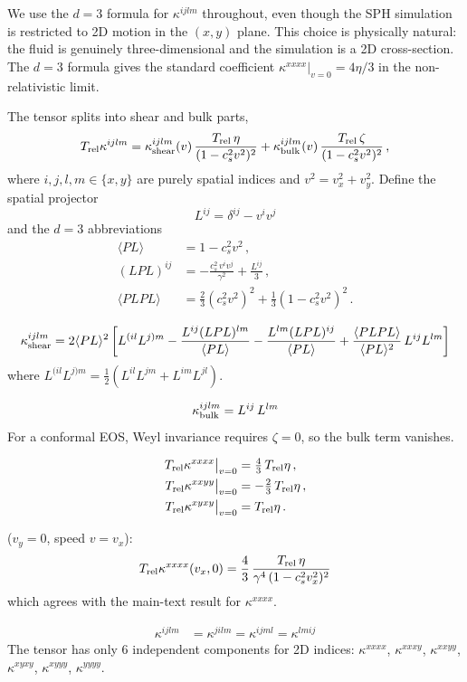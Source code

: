 \documentclass[12pt,aps,preprint,nofootinbib,noshowkeys,noshowpacs,longbibliography,superscriptaddress,tightenlines]{revtex4-2}
\def\st{\begin{equation}}
\def\stp{\end{equation}}
\begin{document}
We use the $d=3$ formula for $\kappa^{ijlm}$ throughout, even though the SPH
simulation is restricted to 2D motion in the $(x,y)$ plane.  This choice is
physically natural: the fluid is genuinely three-dimensional and the simulation
is a 2D cross-section.  The $d=3$ formula gives the standard coefficient
$\kappa^{xxxx}|_{v=0} = 4\eta/3$ in the non-relativistic limit.

The tensor splits into shear and bulk parts,
\st
T_{\rm rel}\kappa^{ijlm}
   = \kappa_{\rm shear}^{ijlm}(v)\,\frac{T_{\rm rel}\,\eta}{(1-c_s^2 v^2)^2}
   + \kappa_{\rm bulk}^{ijlm}(v)\,\frac{T_{\rm rel}\,\zeta}{(1-c_s^2 v^2)^2}\,,
\stp
where $i,j,l,m\in\{x,y\}$ are purely spatial indices and
$v^2 = v_x^2 + v_y^2$.  Define the spatial projector
\st
L^{ij} = \delta^{ij} - v^i v^j
\stp
and the $d=3$ abbreviations
\begin{align}
\langle PL\rangle &= 1 - c_s^2 v^2 \,,\\
(LPL)^{ij} &= -\frac{c_s^2\,v^i v^j}{\gamma^2} + \frac{L^{ij}}{3} \,,\\
\langle PLPL\rangle &= \frac{2}{3}(c_s^2 v^2)^2 + \frac{1}{3}(1-c_s^2 v^2)^2 \,.
\end{align}

\st
\kappa_{\rm shear}^{ijlm} = 2\langle PL\rangle^2\left[L^{(il}L^{j)m}
  - \frac{L^{ij}(LPL)^{lm}}{\langle PL\rangle}
  - \frac{L^{lm}(LPL)^{ij}}{\langle PL\rangle}
  + \frac{\langle PLPL\rangle}{\langle PL\rangle^2}\,L^{ij}L^{lm}\right]
\stp
where $L^{(il}L^{j)m} = \frac{1}{2}(L^{il}L^{jm}+L^{im}L^{jl})$.

\st
\kappa_{\rm bulk}^{ijlm} = L^{ij}\,L^{lm}
\stp
For a conformal EOS, Weyl invariance requires $\zeta=0$, so the bulk term vanishes.

\begin{align}
T_{\rm rel}\kappa^{xxxx}\big|_{v=0} &= \tfrac{4}{3}\,T_{\rm rel}\eta\,,\\
T_{\rm rel}\kappa^{xxyy}\big|_{v=0} &= -\tfrac{2}{3}\,T_{\rm rel}\eta\,,\\
T_{\rm rel}\kappa^{xyxy}\big|_{v=0} &= T_{\rm rel}\eta\,.
\end{align}

 ($v_y=0$, speed $v=v_x$):
\st
T_{\rm rel}\kappa^{xxxx}(v_x,0) = \frac{4}{3}\,\frac{T_{\rm rel}\,\eta}{\gamma^4\,(1-c_s^2 v_x^2)^2}
\stp
which agrees with the main-text result for $\kappa^{xxxx}$.

\begin{align}
\kappa^{ijlm} &= \kappa^{jilm} = \kappa^{ijml} = \kappa^{lmij}
\end{align}
The tensor has only 6 independent components for 2D indices:
$\kappa^{xxxx}$, $\kappa^{xxxy}$, $\kappa^{xxyy}$, $\kappa^{xyxy}$, $\kappa^{xyyy}$, $\kappa^{yyyy}$.
\end{document}
